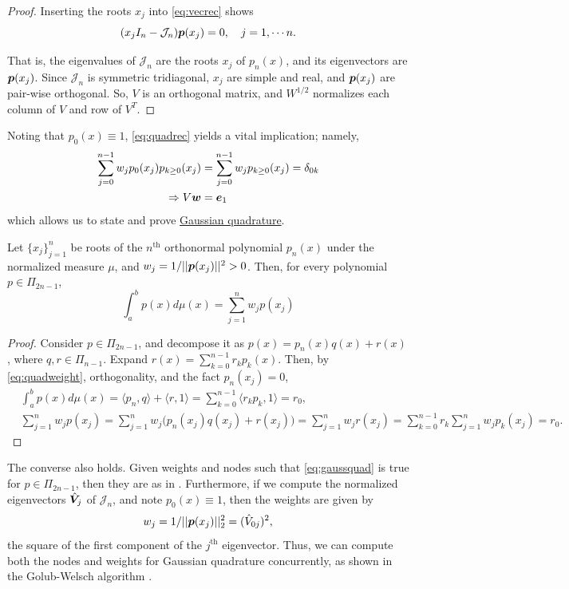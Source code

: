 \begin{proof}
Inserting the roots $x_j$ into \eqref{eq:vecrec} shows 
$$(x_{j}I_n - \mathcal{J}_n)\boldsymbol{p}(x_{j}) = 0,\quad j = 1,\cdots n.$$

That is, the eigenvalues of $\mathcal{J}_n$ are the roots $x_j$ of $p_n(x)$, and its eigenvectors are $\boldsymbol{p}(x_{j})$. Since $\mathcal{J}_n$ is symmetric tridiagonal, $x_j$ are simple and real, and $\boldsymbol{p}(x_j)$ are pair-wise orthogonal. So, $V$ is an orthogonal matrix, and $W^{1/2}$ normalizes each column of $V$ and row of $V^T$.
\end{proof}

Noting that $p_0(x) \equiv 1$, \eqref{eq:quadrec} yields a vital implication; namely,
\begin{equation}\label{eq:quadweight}
\begin{split}
\sum_{j=0}^{n-1}w_jp_0(x_j)p_{k\geq0}(x_j) &= \sum_{j=0}^{n-1}w_jp_{k\geq 0}(x_j) =  \delta_{0k} \\
\Rightarrow V\boldsymbol{w} &= \boldsymbol{e}_1
\end{split}
\end{equation}
which allows us to state and prove \underline{Gaussian quadrature}.
\begin{theorem}\normalfont\label{thm:gaussquad}
Let $\{x_j\}_{j=1}^n$ be roots of the $n^\text{th}$ orthonormal polynomial $p_n(x)$ under the normalized measure $\mu$, and $w_j=1/||\boldsymbol{p}(x_j)||^2 > 0$. Then, for every polynomial $p \in \Pi_{2n-1}$, 
\begin{equation}\label{eq:gaussquad}
\int_a^b p(x) d\mu(x) = \sum_{j=1}^n w_jp(x_j)
\end{equation}
\end{theorem}
\begin{proof}
Consider $p \in \Pi_{2n-1}$, and decompose it as $p(x) = p_n(x)q(x) + r(x)$, where $q,r \in \Pi_{n-1}$. Expand $r(x) = \sum_{k=0}^{n-1}r_kp_k(x)$. Then, by \eqref{eq:quadweight}, orthogonality, and the fact $p_n(x_j) = 0$, 
\begin{align*}
&\int_a^b p(x)d\mu(x) = \big\langle p_n,q\big\rangle + \big\langle r,1\big\rangle = \sum_{k=0}^{n-1}\big\langle r_kp_k,1\big\rangle = r_0,\\
&\sum_{j=1}^n w_jp(x_j) = \sum_{j=1}^nw_j\big(p_n(x_j)q(x_j) + r(x_j)\big) = \sum_{j=1}^n w_jr(x_j) = \sum_{k=0}^{n-1}r_k\sum_{j=1}^n w_jp_k(x_j) = r_0.
\end{align*}
\end{proof}
The converse also holds. Given weights and nodes such that \eqref{eq:gaussquad} is true for $p\in \Pi_{2n-1}$, then they are as in . Furthermore, if we compute the normalized eigenvectors $\hat{\boldsymbol{V}}_j$ of $\mathcal{J}_n$, and note $p_0(x) \equiv 1$, then the weights are given by
\begin{equation}
w_j = 1/||\boldsymbol{p}(x_j)||_2^2 = (\hat{V}_{0j})^2, 
\end{equation}
the square of the first component of the $j^{\text{th}}$ eigenvector. Thus, we can compute both the nodes and weights for Gaussian quadrature concurrently, as shown in the Golub-Welsch algorithm \cite{golub-welsch}. 

